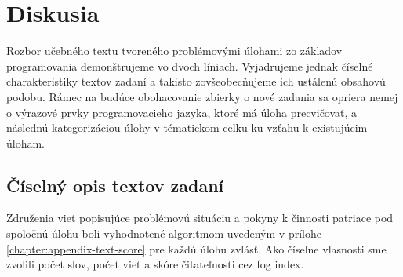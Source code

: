 \section{Diskusia}
Rozbor učebného textu tvoreného problémovými úlohami zo základov programovania demonštrujeme vo dvoch líniach. Vyjadrujeme jednak číselné charakteristiky textov zadaní a takisto zovšeobecňujeme ich ustálenú obsahovú podobu. Rámec na budúce obohacovanie zbierky o nové zadania sa opriera nemej o výrazové prvky programovacieho jazyka, ktoré má úloha precvičovať, a následnú kategorizáciou úlohy v tématickom celku ku vzťahu k existujúcim úloham. 

\subsection{Číselný opis textov zadaní}
Združenia viet popisujúce problémovú situáciu a pokyny k činnosti patriace pod spoločnú úlohu boli vyhodnotené algoritmom uvedeným v prílohe \ref{chapter:appendix-text-score} pre každú úlohu zvlásť. Ako číselne vlasnosti sme zvolili počet slov, počet viet a skóre čitateľnosti cez fog index. 

